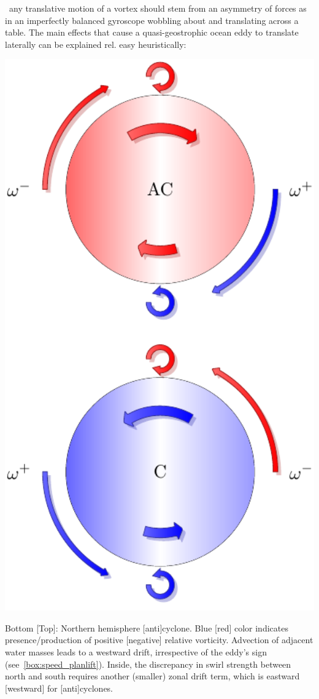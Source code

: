 ~any translative motion of a vortex should stem from an asymmetry of forces as in an imperfectly balanced gyroscope wobbling about and translating across a table.
The main effects that cause a quasi-geostrophic ocean eddy to translate laterally can be explained rel. easy heuristically:

\begin{marginfigure}
\includegraphics[width=1\textwidth]{eddyTikz}
\caption{Bottom [Top]: Northern hemisphere [anti]cyclone. Blue [red] color indicates presence/production of positive [negative] relative vorticity. Advection of adjacent water masses leads to a westward drift, irrespective of the eddy's sign (see~\cref{box:speed_planlift}). Inside, the discrepancy in swirl strength between north and south requires another (smaller) zonal drift term, which is eastward [westward] for [anti]cyclones. }
\label{fig:eddyTikz}
\end{marginfigure}

